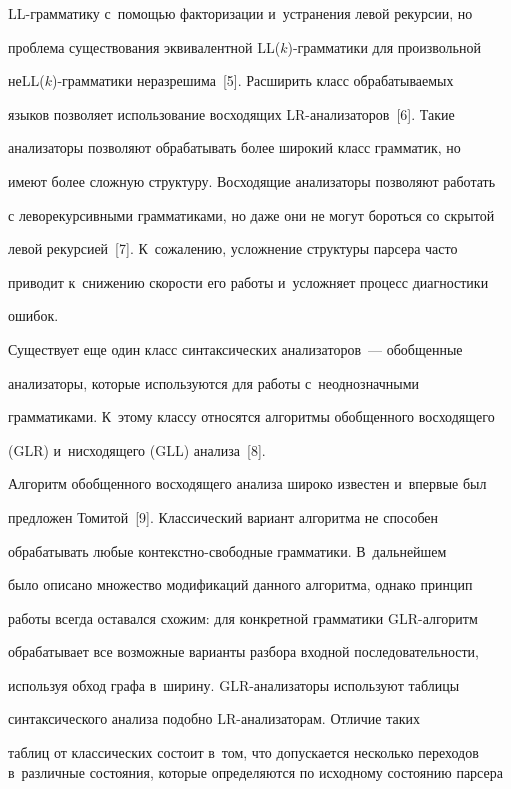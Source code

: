 LL-грам\-ма\-ти\-ку с~помощью факторизации и~устранения левой рекурсии, но


проблема существования эквивалентной LL($k$)-грамматики для произвольной


неLL($k$)-грам\-ма\-ти\-ки неразрешима~[5]. Расширить класс обрабатываемых


языков позволяет использование восходящих LR-ана\-ли\-за\-то\-ров~[6]. Такие


анализаторы позволяют обрабатывать более широкий класс грамматик, но


имеют более сложную структуру. Восходящие анализаторы позволяют работать


с леворекурсивными грамматиками, но даже они не могут бороться со скрытой


левой рекурсией~[7]. К~сожалению, усложнение структуры парсера часто


приводит к~снижению скорости его работы и~усложняет процесс диагностики


ошибок.





Существует еще один класс синтаксических анализаторов~--- обобщенные


анализаторы, которые используются для работы с~неоднозначными


грамматиками. К~этому классу относятся алгоритмы обобщенного восходящего


(GLR) и~нисходящего (GLL) анализа~[8].


Алгоритм обобщенного восходящего анализа широко известен и~впервые был


предложен Томитой~[9]. Классический вариант алгоритма не способен


обрабатывать любые кон\-текст\-но-сво\-бод\-ные грамматики. В~дальнейшем


было описано множество модификаций данного алгоритма, однако принцип


работы всегда оставался схожим: для конкретной грамматики GLR-ал\-го\-ритм


обрабатывает все возможные варианты разбора входной последовательности,


используя обход графа в~ширину. GLR-ана\-ли\-за\-то\-ры используют таблицы


синтаксического анализа подобно LR-ана\-ли\-за\-то\-рам. Отличие таких


таблиц от классических состоит в~том, что допускается несколько переходов в~различные состояния, которые определяются по исходному состоянию парсера


